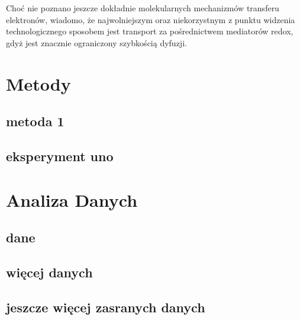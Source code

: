 \documentclass[12pt, a4paper]{article}
\begin{document}
Choć nie poznano jeszcze dokładnie molekularnych mechanizmów
transferu elektronów, wiadomo, że najwolniejszym oraz
niekorzystnym z punktu widzenia technologicznego sposobem jest
transport za pośrednictwem mediatorów redox, gdyż jest znacznie
ograniczony szybkością dyfuzji.

\section{Metody}\label{sec:metody}

\subsection{metoda 1}
\lipsum[2]
\subsection{eksperyment uno}
\lipsum[3-5]

\section{Analiza Danych}\label{sec:analiza-danych}
\subsection{dane}
\lipsum[2-4]
\subsection{więcej danych}
\lipsum[2-4]
\subsection{jeszcze więcej zasranych danych}
\lipsum[2-4]



\end{document}
